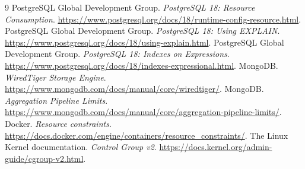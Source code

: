 \documentclass[11pt,letterpaper]{article}
\begin{document}








\clearpage
{}
\begin{thebibliography}{9}
 PostgreSQL Global Development Group. \textit{PostgreSQL 18: Resource Consumption}. \url{https://www.postgresql.org/docs/18/runtime-config-resource.html}.
 PostgreSQL Global Development Group. \textit{PostgreSQL 18: Using EXPLAIN}. \url{https://www.postgresql.org/docs/18/using-explain.html}.
 PostgreSQL Global Development Group. \textit{PostgreSQL 18: Indexes on Expressions}. \url{https://www.postgresql.org/docs/18/indexes-expressional.html}.
 MongoDB. \textit{WiredTiger Storage Engine}. \url{https://www.mongodb.com/docs/manual/core/wiredtiger/}.
 MongoDB. \textit{Aggregation Pipeline Limits}. \url{https://www.mongodb.com/docs/manual/core/aggregation-pipeline-limits/}.
 Docker. \textit{Resource constraints}. \url{https://docs.docker.com/engine/containers/resource_constraints/}.
 The Linux Kernel documentation. \textit{Control Group v2}. \url{https://docs.kernel.org/admin-guide/cgroup-v2.html}.
\end{thebibliography}
\appendix

\end{document}
